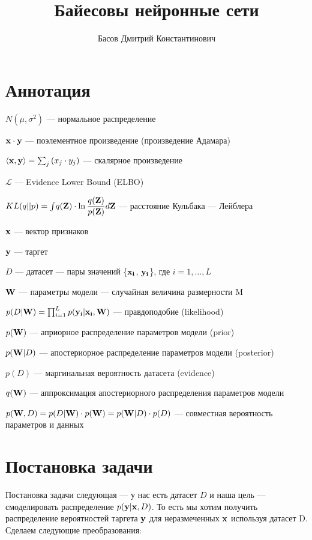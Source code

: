 \documentclass{article}
\title{Байесовы нейронные сети}
\author{Басов Дмитрий Константинович}
\date{}
\begin{document}
\maketitle

\section{Аннотация}
$N(\mu, \sigma^2)$ — нормальное распределение

$\bold{x} \cdot \bold{y}$ — поэлементное произведение (произведение Адамара)

$\langle  \bold{x}, \bold{y} \rangle = \sum_{j}{(x_{j} \cdot y_{j})}$ — скалярное произведение

$\mathcal{L}$ — Evidence Lower Bound (ELBO)

$KL(q || p) = \int_{}{} q(\bold{Z}) \cdot \ln{\dfrac{q(\bold{Z})}{p(\bold{Z})}} d\bold{Z}$ — расстояние Кульбака — Лейблера

$\bold{x}$ — вектор признаков

$\bold{y}$ — таргет

$D$ — датасет — пары значений \{$\bold{x_i}$, $\bold{y_i}$\}, где $i = 1, \dots, L$

$\bold{W}$ — параметры модели — случайная величина размерности M

$p(D | \bold{W}) = \prod_{i=1}^{L} p(\bold{y_i} | \bold{x_i}, \bold{W})$ — правдоподобие (likelihood)

$p(\bold{W})$ — априорное распределение параметров модели (prior)

$p(\bold{W}| D)$ — апостериорное распределение параметров модели (posterior)

$p(D)$ — маргинальная вероятность датасета (evidence)

$q(\bold{W})$ — аппроксимация апостериорного распределения параметров модели

$p(\bold{W}, D) =
p(D | \bold{W}) \cdot p(\bold{W}) =
p(\bold{W}| D)\cdot p(D)$
— совместная вероятность параметров и данных

\section{Постановка задачи}
Постановка задачи следующая — у нас есть датасет $D$ и наша цель — смоделировать распределение $p(\bold{y} | \bold{x}, D)$. То есть мы хотим получить распределение вероятностей таргета $\bold{y}$ для неразмеченных $\bold{x}$ используя датасет D. Сделаем следующие преобразования:
\end{document}
